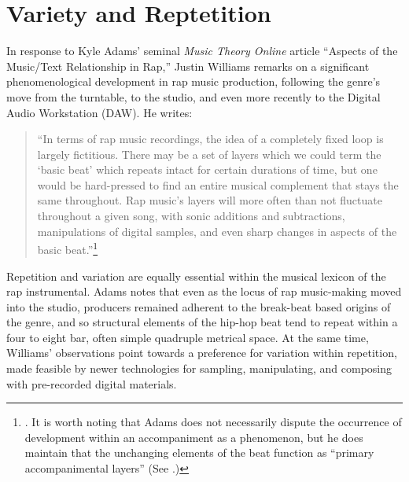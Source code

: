 \onehalfspacing 
\label{chapter2}
\section{Variety and Reptetition}
In response to Kyle Adams' seminal \textit{Music Theory Online} article ``Aspects of the Music/Text Relationship in Rap,'' Justin Williams remarks on a significant phenomenological development in rap music production, following the genre's move from the turntable, to the studio, and even more recently to the Digital Audio Workstation (DAW). He writes:

\begin{quote}
    \small ``In terms of rap music recordings, the idea of a completely fixed loop is largely fictitious. There may be a set of layers which we could term the `basic beat' which repeats intact for certain durations of time, but one would be hard-pressed to find an entire musical complement that stays the same throughout. Rap music’s layers will more often than not fluctuate throughout a given song, with sonic additions and subtractions, manipulations of digital samples, and even sharp changes in aspects of the basic beat.''\footnote{\cite{justinawilliamsBeatsFlowsResponse2009}. It is worth noting that Adams does not necessarily dispute the occurrence of development within an accompaniment as a phenomenon, but he does maintain that the unchanging elements of the beat function as ``primary accompanimental layers'' (See \cite{kyleadamsPeopleInstinctiveAssumptions2009}.)}
\end{quote}

\noindent \normalsize Repetition and variation are equally essential within the musical lexicon of the rap instrumental. Adams notes that even as the locus of rap music-making moved into the studio, producers remained adherent to the break-beat based origins of the genre, and so structural elements of the hip-hop beat tend to repeat within a four to eight bar, often simple quadruple metrical space. At the same time, Williams' observations point towards a preference for variation within repetition, made feasible by newer technologies for sampling, manipulating, and composing with pre-recorded digital materials.

